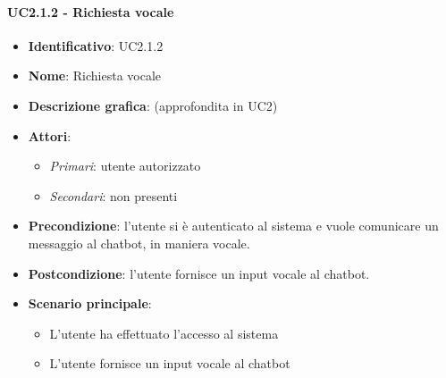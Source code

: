 \paragraph{UC2.1.2 - Richiesta vocale}
\begin{itemize}
    \item \textbf{Identificativo}: UC2.1.2
    \item \textbf{Nome}: Richiesta vocale
    \item \textbf{Descrizione grafica}: (approfondita in UC2)
    \item \textbf{Attori}:
    \begin{itemize} 
        \item \textit{Primari}: utente autorizzato
        \item \textit{Secondari}: non presenti
    \end{itemize}
        \item \textbf{Precondizione}: l'utente si è autenticato al sistema e vuole comunicare un messaggio al chatbot, in maniera vocale. 
        \item \textbf{Postcondizione}: l'utente fornisce un input vocale al chatbot. 
     \item \textbf{Scenario principale}: 
        \begin{itemize}
            \item L'utente ha effettuato l'accesso al sistema 
            \item L'utente fornisce un input vocale al chatbot 
        \end{itemize}
\end{itemize}

